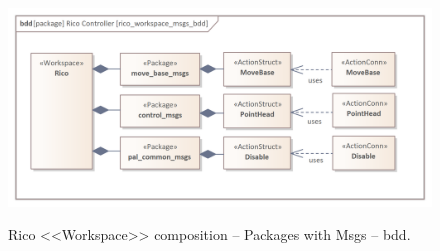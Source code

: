 \begin{figure}[H]
    \centering
    \begin{center}
    {\includegraphics[scale=1.0]{../imgs/rico_pkg/rico_workspace_msgs_bdd.png}}
    \end{center}
    \caption{Rico <<Workspace>> composition -- Packages with Msgs -- bdd.}
    \label{fig:rico_workspace_msgs_bdd}
\end{figure}

